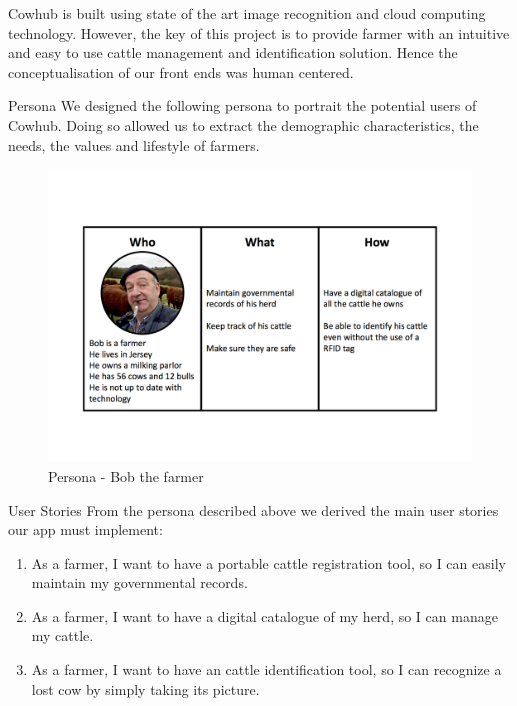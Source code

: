 %

Cowhub is built using state of the art image recognition and cloud computing technology. However, the key of this project is to provide farmer with an intuitive and easy to use cattle management and identification solution. Hence the conceptualisation of our front ends was human centered.


\begin{subsection}{Persona}
  We designed the following persona to portrait the potential users of Cowhub. Doing so allowed us to extract the demographic characteristics, the needs, the values and lifestyle of farmers.
  \begin{figure}[H]
  	\centering
    \includegraphics[width=1\textwidth]{images/persona.png}
  	\caption[Persona]{Persona - Bob the farmer}
  \end{figure}
\end{subsection}


\begin{subsection}{User Stories}
  From the persona described above we derived the main user stories our app must implement:
  \begin{enumerate}
    \item As a farmer, I want to have a portable cattle registration tool, so I can easily maintain my governmental records.
    \item As a farmer, I want to have a digital catalogue of my herd, so I can manage my cattle.
    \item As a farmer, I want to have an cattle identification tool, so I can recognize a lost cow by simply taking its picture.
  \end{enumerate}
\end{subsection}

